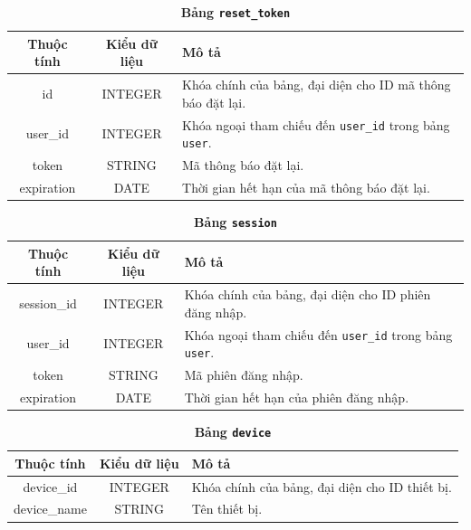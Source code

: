 \documentclass{article}%
\begin{document}
\begin{table}[H]
  \caption{\bfseries \fontsize{12pt}{0pt}\selectfont Bảng \texttt{reset\_token}}
  \centering
  \begin{tabularx}{0.9\textwidth}{|c|c|X|}
    \hline
    \textbf{Thuộc tính} & \textbf{Kiểu dữ liệu} & \textbf{Mô tả} \\
    \hline
    id & INTEGER & Khóa chính của bảng, đại diện cho ID mã thông báo đặt lại. \\
    \hline
    user\_id & INTEGER & Khóa ngoại tham chiếu đến \texttt{user\_id} trong bảng \texttt{user}. \\
    \hline
    token & STRING & Mã thông báo đặt lại. \\
    \hline
    expiration & DATE & Thời gian hết hạn của mã thông báo đặt lại. \\
    \hline
  \end{tabularx}
\end{table}


\begin{table}[H]
  \caption{\bfseries \fontsize{12pt}{0pt}\selectfont Bảng \texttt{session}}
  \centering
  \begin{tabularx}{0.9\textwidth}{|c|c|X|}
    \hline
    \textbf{Thuộc tính} & \textbf{Kiểu dữ liệu} & \textbf{Mô tả} \\
    \hline
    session\_id & INTEGER & Khóa chính của bảng, đại diện cho ID phiên đăng nhập. \\
    \hline
    user\_id & INTEGER & Khóa ngoại tham chiếu đến \texttt{user\_id} trong bảng \texttt{user}. \\
    \hline
    token & STRING & Mã phiên đăng nhập. \\
    \hline
    expiration & DATE & Thời gian hết hạn của phiên đăng nhập. \\
    \hline
  \end{tabularx}
\end{table}

\begin{table}[H]
  \caption{\bfseries \fontsize{12pt}{0pt}\selectfont Bảng \texttt{device}}
  \centering
  \begin{tabularx}{0.9\textwidth}{|c|c|X|}
    \hline
    \textbf{Thuộc tính} & \textbf{Kiểu dữ liệu} & \textbf{Mô tả} \\
    \hline
    device\_id & INTEGER & Khóa chính của bảng, đại diện cho ID thiết bị. \\
    \hline
    device\_name & STRING & Tên thiết bị. \\
    \hline
  \end{tabularx}
\end{table}
\end{document}
